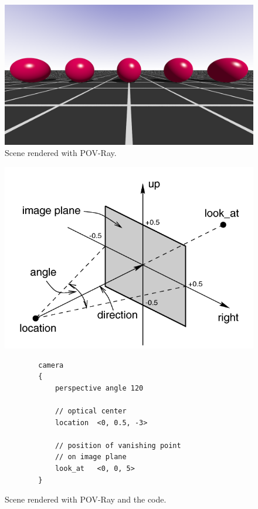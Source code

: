 \documentclass[a4paper,twocolumn]{article}
\begin{document}
	
	\begin{figure}[h]
		\centering
		\includegraphics[width=\columnwidth]{images/task_1c.png}
		\caption{Scene rendered with POV-Ray.}
		\label{fig:povray_scene}
	\end{figure}
	
	\begin{figure}[h]
		\centering
		\includegraphics[width=0.9\columnwidth]{images/povray_camera.png}
		\begin{verbatim}
		camera
		{
		    perspective angle 120
		    
		    // optical center
		    location  <0, 0.5, -3>
		    
		    // position of vanishing point
		    // on image plane
		    look_at   <0, 0, 5>
		}
		\end{verbatim}
		\caption{Scene rendered with POV-Ray and the code.}
		\label{fig:povray_camera}
	\end{figure}
	
	
	
	 
	
	
	
	
\end{document}
